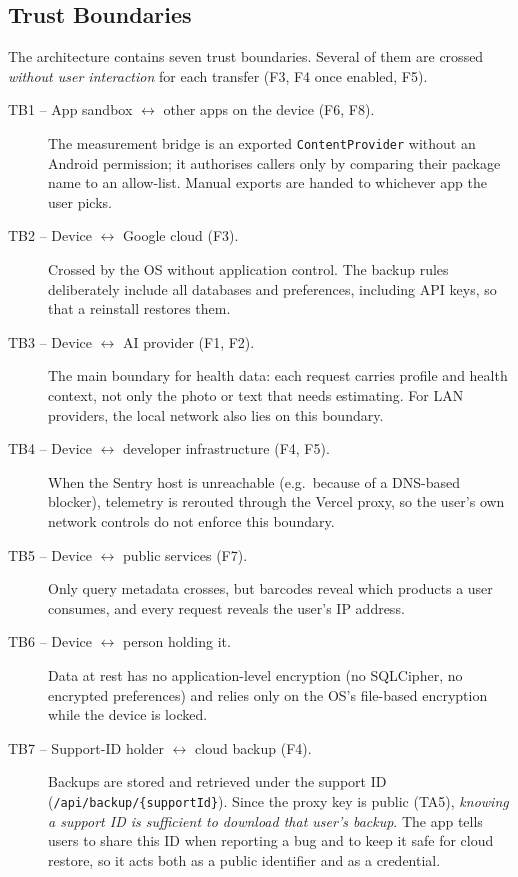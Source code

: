 \subsection{Trust Boundaries}
The architecture contains seven trust boundaries. Several of them are crossed
\emph{without user interaction} for each transfer (F3, F4 once enabled, F5).

\begin{description}
  \item[TB1 -- App sandbox $\leftrightarrow$ other apps on the device (F6, F8).] The measurement
    bridge is an exported \texttt{ContentProvider} without an Android permission; it authorises
    callers only by comparing their package name to an allow-list. Manual exports are handed to
    whichever app the user picks.
  \item[TB2 -- Device $\leftrightarrow$ Google cloud (F3).] Crossed by the OS without application
    control. The backup rules deliberately include all databases and preferences, including API
    keys, so that a reinstall restores them.
  \item[TB3 -- Device $\leftrightarrow$ AI provider (F1, F2).] The main boundary for health data:
    each request carries profile and health context, not only the photo or text that needs
    estimating. For LAN providers, the local network also lies on this boundary.
  \item[TB4 -- Device $\leftrightarrow$ developer infrastructure (F4, F5).] When the Sentry host is
    unreachable (e.g.\ because of a DNS-based blocker), telemetry is rerouted through the Vercel
    proxy, so the user's own network controls do not enforce this boundary.
  \item[TB5 -- Device $\leftrightarrow$ public services (F7).] Only query metadata crosses, but
    barcodes reveal which products a user consumes, and every request reveals the user's IP
    address.
  \item[TB6 -- Device $\leftrightarrow$ person holding it.] Data at rest has no application-level
    encryption (no SQLCipher, no encrypted preferences) and relies only on the OS's file-based
    encryption while the device is locked.
  \item[TB7 -- Support-ID holder $\leftrightarrow$ cloud backup (F4).] Backups are stored and
    retrieved under the support ID (\texttt{/api/backup/\{supportId\}}). Since the proxy key is
    public (TA5), \emph{knowing a support ID is sufficient to download that user's backup}. The
    app tells users to share this ID when reporting a bug and to keep it safe for cloud restore,
    so it acts both as a public identifier and as a credential.
\end{description}

